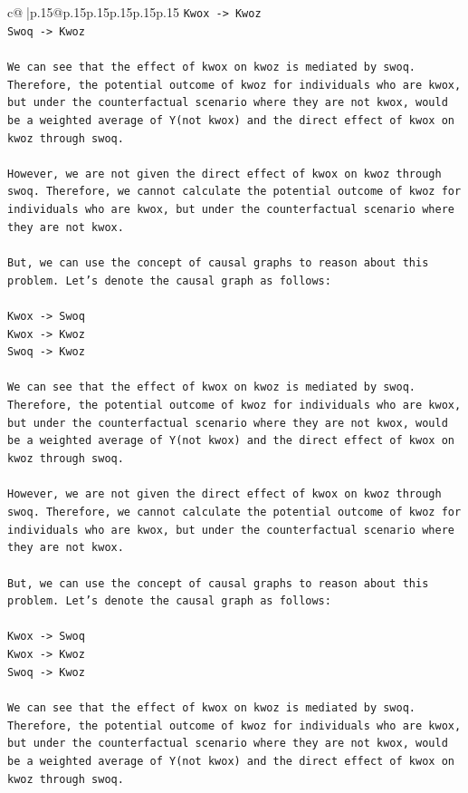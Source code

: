 \documentclass{article}
\begin{document}
{\begin{supertabular}{c@{$\;$}|p{.15\linewidth}@{}p{.15\linewidth}p{.15\linewidth}p{.15\linewidth}p{.15\linewidth}p{.15\linewidth}}
{{{\texttt{Kwox {-}> Kwoz} \\
\texttt{Swoq {-}> Kwoz} \\
\\ 
\texttt{We can see that the effect of kwox on kwoz is mediated by swoq. Therefore, the potential outcome of kwoz for individuals who are kwox, but under the counterfactual scenario where they are not kwox, would be a weighted average of Y(not kwox) and the direct effect of kwox on kwoz through swoq.} \\
\\ 
\texttt{However, we are not given the direct effect of kwox on kwoz through swoq. Therefore, we cannot calculate the potential outcome of kwoz for individuals who are kwox, but under the counterfactual scenario where they are not kwox.} \\
\\ 
\texttt{But, we can use the concept of causal graphs to reason about this problem. Let's denote the causal graph as follows:} \\
\\ 
\texttt{Kwox {-}> Swoq} \\
\texttt{Kwox {-}> Kwoz} \\
\texttt{Swoq {-}> Kwoz} \\
\\ 
\texttt{We can see that the effect of kwox on kwoz is mediated by swoq. Therefore, the potential outcome of kwoz for individuals who are kwox, but under the counterfactual scenario where they are not kwox, would be a weighted average of Y(not kwox) and the direct effect of kwox on kwoz through swoq.} \\
\\ 
\texttt{However, we are not given the direct effect of kwox on kwoz through swoq. Therefore, we cannot calculate the potential outcome of kwoz for individuals who are kwox, but under the counterfactual scenario where they are not kwox.} \\
\\ 
\texttt{But, we can use the concept of causal graphs to reason about this problem. Let's denote the causal graph as follows:} \\
\\ 
\texttt{Kwox {-}> Swoq} \\
\texttt{Kwox {-}> Kwoz} \\
\texttt{Swoq {-}> Kwoz} \\
\\ 
\texttt{We can see that the effect of kwox on kwoz is mediated by swoq. Therefore, the potential outcome of kwoz for individuals who are kwox, but under the counterfactual scenario where they are not kwox, would be a weighted average of Y(not kwox) and the direct effect of kwox on kwoz through swoq.} \\
}}}
\end{supertabular}}
\end{document}
